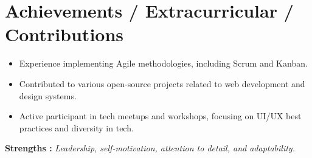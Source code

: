 \documentclass[letterpaper,11pt]{article}
\newcommand{\resumeItem}[1]{
  \item\small{
    {#1 \vspace{-2pt}}
  }
}
\newcommand{\resumeSubHeadingListStart}{\begin{itemize}[leftmargin=0.0in, label={}]}
\newcommand{\resumeSubHeadingListEnd}{\end{itemize}}
\newcommand{\resumeItemListStart}{\begin{itemize}}
\newcommand{\resumeItemListEnd}{\end{itemize}\vspace{-5pt}}
\begin{document}
\section{Achievements / Extracurricular / Contributions}
\resumeSubHeadingListStart
\resumeItemListStart
\resumeItem{Experience implementing Agile methodologies, including Scrum and Kanban.}
\resumeItem{Contributed to various open-source projects related to web development and design systems.}
\resumeItem{Active participant in tech meetups and workshops, focusing on UI/UX best practices and diversity in tech.}
\resumeItemListEnd

\resumeSubHeadingListEnd
\textbf{Strengths : }\emph{Leadership, self-motivation, attention to detail, and adaptability.} \\

\vspace{10pt}
\end{document}
